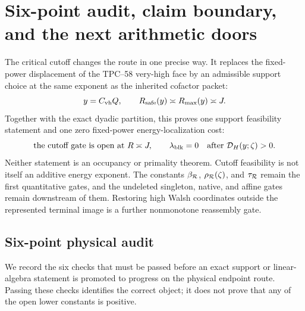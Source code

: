 \section{Six-point audit, claim boundary, and the next arithmetic doors}
\label{sec:tpc59-claims}

The critical cutoff changes the route in one precise way.  It replaces the
fixed-power displacement of the TPC--58 very-high face by an admissible
support choice at the same exponent as the inherited cofactor packet:
\begin{equation}
 y=C_{\rm vh}Q,
 \qquad
 R_{\rm safe}(y)\asymp R_{\rm max}(y)\asymp J.
 \label{eq:tpc59-final-critical-route}
\end{equation}
Together with the exact dyadic partition, this proves one support
feasibility statement and one zero fixed-power energy-localization cost:
\begin{equation}
 \text{the cutoff gate is open at }R\asymp J,
 \qquad
 \lambda_{\rm blk}=0
 \quad\text{after }\mathcal D_H(y;\zeta)>0.
 \label{eq:tpc59-final-two-zero-costs}
\end{equation}
Neither statement is an occupancy or primality theorem.  Cutoff feasibility
is not itself an additive energy exponent.  The constants
\(\beta_{\mathcal R}\), \(\rho_{\mathcal R}(\zeta)\), and \(\tau_{\mathcal R}\) remain the
first quantitative gates, and the undeleted singleton, native, and affine
gates remain downstream of them.  Restoring high Walsh coordinates outside
the represented terminal image is a further nonmonotone reassembly gate.

\subsection{Six-point physical audit}

We record the six checks that must be passed before an exact support or
linear-algebra statement is promoted to progress on the physical endpoint
route.  Passing these checks identifies the correct object; it does not
prove that any of the open lower constants is positive.


